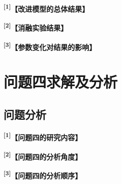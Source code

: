\documentclass[UTF8,a4paper,12pt,fontset=fandol]{ctexart}
\newif\ifDraftAid
\newcommand{\ph}[1]{\textbf{\color{phg}【#1】}}
\newcommand{\detail}[1]{%
  \ifDraftAid\textnormal{\color{detailg}\small\,（参考写法：#1）}\fi}
\newcommand{\PHD}[2]{\ph{#1}\detail{#2}}
\newcommand{\SN}[1]{\textsuperscript{\color{noteg}\bfseries[#1]}}
\newcommand{\Note}[2]{\par\noindent\textbf{[#1]}\ #2}
\newcommand{\Annotated}[2]{%
\ifDraftAid
\noindent\begin{minipage}[t]{0.735\linewidth}\vspace{0pt}#1\end{minipage}\hfill
\begin{minipage}[t]{0.235\linewidth}\vspace{0pt}\footnotesize\color{noteg}\raggedright
\begin{tcolorbox}[colback=notebg,colframe=ruleg,boxrule=0.35pt,arc=1mm,left=1.2mm,right=1.2mm,top=1mm,bottom=1mm]
#2
\end{tcolorbox}\end{minipage}
\else
#1
\fi
}
\numberwithin{figure}{section}
\numberwithin{table}{section}
\begin{document}
\Annotated{
\SN{1}\PHD{改进模型的总体结果}{由表〔编号〕可知，改进后模型的〔主要指标〕由〔数值A〕提高/降低至〔数值B〕，同时〔问题三相关指标〕由〔数值C〕变化为〔数值D〕。说明所采用的改进方法对〔问题三中的主要困难〕具有一定作用，能够有效减小〔差异或代价〕，提升〔目标性能〕。}

\par\medskip
\SN{2}\PHD{消融实验结果}{为进一步分析〔新增模块〕的作用，在其他实验设置保持不变的情况下去除该模块。结果显示，〔指标〕由〔完整模型数值〕变为〔消融后数值〕，说明〔新增模块〕对〔具体性能〕的提升具有较明显贡献，验证了该模块的有效性。}

\par\medskip
\SN{3}\PHD{参数变化对结果的影响}{进一步改变参数 $\alpha$ 的取值，结果如图〔编号〕所示。当 $\alpha$ 位于〔区间〕时，〔主要指标〕变化较小；当其继续增大或减小时，〔指标〕出现明显下降。因此，本文取 $\alpha=〔最终取值〕$。}
}{
\Note{1}{先说明完整模型的总体结果，再讨论各部分作用。}
\Note{2}{若进行了消融实验，重点比较去除某部分前后的指标变化。}
\Note{3}{参数分析主要观察结论是否随参数变化而明显改变。}
}

\section{问题四求解及分析}
\subsection{问题分析}
\Annotated{
\SN{1}\PHD{问题四的研究内容}{在〔任务〕应用于〔复杂场景〕的过程中，模型的〔可解释性或实用性〕是一个亟待解决的重要问题。模型通常被视为“黑箱”，其决策过程往往难以被直观理解，这不仅导致〔使用者〕对模型结果缺乏信任，还可能影响模型的实际应用效果。因此，提升〔可解释性或实用性〕，帮助用户理解模型的决策逻辑，对于〔任务的准确性与信任度〕至关重要。}

\par\medskip
\SN{2}\PHD{问题四的分析角度}{本文的研究重点之一是提高〔可解释性或分析深度〕，尤其是〔问题三模型〕。通过深入分析〔模型结构、迁移过程以及决策机制〕，结合〔研究对象的特点和原理〕，从〔角度一〕、〔角度二〕和〔角度三〕展开分析。例如，可分别考察〔变量影响〕、〔不同条件下的结果变化〕以及〔模型结果与实际规律的一致性〕。}

\par\medskip
\SN{3}\PHD{问题四的分析顺序}{首先分析〔模型结构、变量或已有结果〕；随后观察〔中间特征、参数或过程量〕的变化；最后将〔最终结果〕与〔实际规律、外部资料或题目条件〕进行对照，从而说明〔问题四需要回答的内容〕。通过这种分析，本文不仅提升了模型的〔可解释性或实用性〕，也增强了模型在不同场景下的适应性和可信度，为实际应用提供了理论基础。}
}{
\Note{1}{问题四按题目要求展开，不必重复前三问已经完成的训练过程。}
\Note{2}{若问题要求可解释性，可分别从特征、过程和结果等角度进行分析。}
\Note{3}{若第四问不是可解释性，应按实际题意替换为相应分析步骤。}
}
\end{document}
